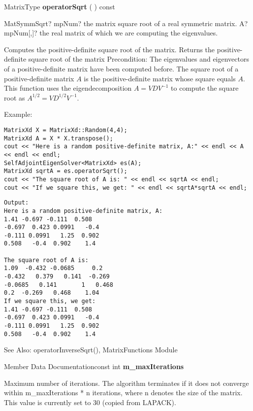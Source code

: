 \vspace{0.3cm}
MatrixType \textbf{operatorSqrt}  ( )  const 



\begin{mpFunctionsExtract}
	\mpFunctionOne
	{MatSymmSqrt? mpNum? the matrix square root of a real symmetric matrix.}
	{A? mpNum[,]? the real matrix of which we are computing the eigenvalues.}
\end{mpFunctionsExtract}


Computes the positive-definite square root of the matrix. 
Returns the positive-definite square root of the matrix
Precondition: The eigenvalues and eigenvectors of a positive-definite matrix have been computed before.
The square root of a positive-definite matrix $A$ is the positive-definite matrix whose square equals $A$. This function uses the eigendecomposition $A = V D V^{-1}$ to compute the square root as $A^{1/2} = V D^{1/2} V^{-1}$.


Example:
\begin{lstlisting}
MatrixXd X = MatrixXd::Random(4,4);
MatrixXd A = X * X.transpose();
cout << "Here is a random positive-definite matrix, A:" << endl << A << endl << endl;
SelfAdjointEigenSolver<MatrixXd> es(A);
MatrixXd sqrtA = es.operatorSqrt();
cout << "The square root of A is: " << endl << sqrtA << endl;
cout << "If we square this, we get: " << endl << sqrtA*sqrtA << endl;
\end{lstlisting}

\begin{verbatim}
Output:
Here is a random positive-definite matrix, A:
1.41 -0.697 -0.111  0.508
-0.697  0.423 0.0991   -0.4
-0.111 0.0991   1.25  0.902
0.508   -0.4  0.902    1.4

The square root of A is: 
1.09  -0.432 -0.0685     0.2
-0.432   0.379   0.141  -0.269
-0.0685   0.141       1   0.468
0.2  -0.269   0.468    1.04
If we square this, we get: 
1.41 -0.697 -0.111  0.508
-0.697  0.423 0.0991   -0.4
-0.111 0.0991   1.25  0.902
0.508   -0.4  0.902    1.4
\end{verbatim}
See Also: operatorInverseSqrt(), MatrixFunctions Module 

\vspace{0.3cm}
Member Data Documentationconst int \textbf{m\_maxIterations} 

Maximum number of iterations. The algorithm terminates if it does not converge within m\_maxIterations * n iterations, where n denotes the size of the matrix. This value is currently set to 30 (copied from LAPACK). 



